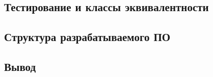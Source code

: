 


\subsection{Тестирование и классы эквивалентности}

\subsection{Структура разрабатываемого ПО}

\subsection*{Вывод}
